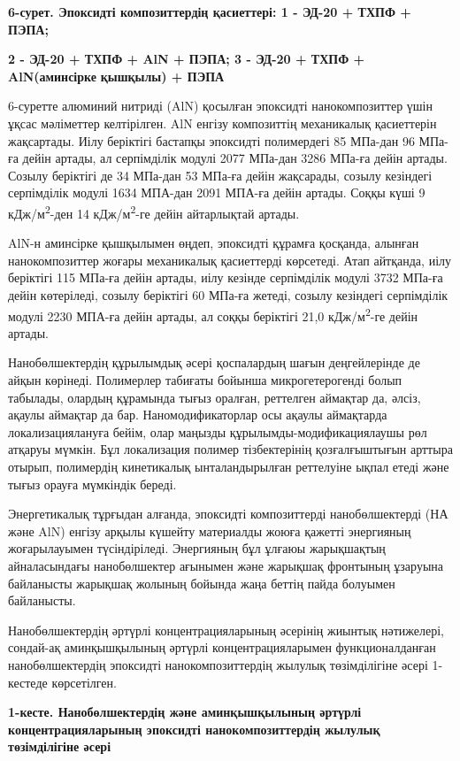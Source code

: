 {\bfseries 6-сурет. Эпоксидті композиттердің қасиеттері: 1 - ЭД-20 + ТХПФ +
ПЭПА;}

{\bfseries 2 - ЭД-20 + ТХПФ + AlN + ПЭПА; 3 - ЭД-20 + ТХПФ + AlN(аминсірке}
{\bfseries қышқылы) + ПЭПА}

6-суретте алюминий нитриді (AlN) қосылған эпоксидті нанокомпозиттер үшін
ұқсас мәліметтер келтірілген. AlN енгізу композиттің механикалық
қасиеттерін жақсартады. Иілу беріктігі бастапқы эпоксидті полимердегі 85
МПа-дан 96 МПа-ға дейін артады, ал серпімділік модулі 2077 МПа-дан 3286
МПа-ға дейін артады. Созылу беріктігі де 34 МПа-дан 53 МПа-ға дейін
жақсарады, созылу кезіндегі серпімділік модулі 1634 МПА-дан 2091 МПА-ға
дейін артады. Соққы күші 9 кДж/м\textsuperscript{2}-ден 14
кДж/м\textsuperscript{2}-ге дейін айтарлықтай артады.

AlN-н аминсірке қышқылымен өңдеп, эпоксидті құрамға қосқанда, алынған
нанокомпозиттер жоғары механикалық қасиеттерді көрсетеді. Атап айтқанда,
иілу беріктігі 115 МПа-ға дейін артады, иілу кезінде серпімділік модулі
3732 МПа-ға дейін көтеріледі, созылу беріктігі 60 МПа-ға жетеді, созылу
кезіндегі серпімділік модулі 2230 МПА-ға дейін артады, ал соққы
беріктігі 21,0 кДж/м\textsuperscript{2}-ге дейін артады.

Нанобөлшектердің құрылымдық әсері қоспалардың шағын деңгейлерінде де
айқын көрінеді. Полимерлер табиғаты бойынша микрогетерогенді болып
табылады, олардың құрамында тығыз оралған, реттелген аймақтар да, әлсіз,
ақаулы аймақтар да бар. Наномодификаторлар осы ақаулы аймақтарда
локализациялануға бейім, олар маңызды құрылымды-модификациялаушы рөл
атқаруы мүмкін. Бұл локализация полимер тізбектерінің қозғалғыштығын
арттыра отырып, полимердің кинетикалық ынталандырылған реттелуіне ықпал
етеді және тығыз орауға мүмкіндік береді.

Энергетикалық тұрғыдан алғанда, эпоксидті композиттерді нанобөлшектерді
(НА және AlN) енгізу арқылы күшейту материалды жоюға қажетті энергияның
жоғарылауымен түсіндіріледі. Энергияның бұл ұлғаюы жарықшақтың
айналасындағы нанобөлшектер ағынымен және жарықшақ фронтының ұзаруына
байланысты жарықшақ жолының бойында жаңа беттің пайда болуымен
байланысты.

Нанобөлшектердің әртүрлі концентрацияларының әсерінің жиынтық
нәтижелері, сондай-ақ аминқышқылының әртүрлі концентрацияларымен
функционалданған нанобөлшектердің эпоксидті нанокомпозиттердің жылулық
төзімділігіне әсері 1-кестеде көрсетілген.

{\bfseries 1-кесте. Нанобөлшектердің және аминқышқылының әртүрлі
концентрацияларының эпоксидті нанокомпозиттердің жылулық төзімділігіне
әсері}

